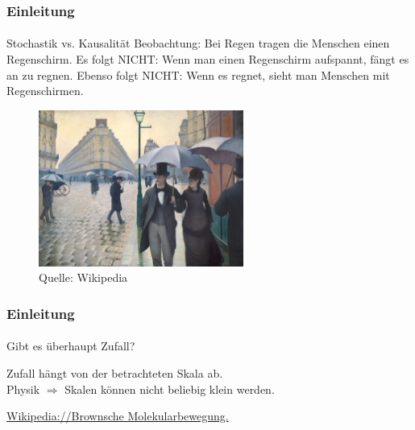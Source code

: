 \documentclass{beamer}
\begin{document}
\begin{frame}
    \frametitle{Einleitung}
\framesubtitle{}

    \begin{block}{Stochastik vs. Kausalität}
Beobachtung: Bei Regen tragen die Menschen einen Regenschirm.
Es folgt NICHT: Wenn man einen Regenschirm aufspannt, fängt es an zu regnen.
Ebenso folgt NICHT: Wenn es regnet, sieht man Menschen mit Regenschirmen. 
\end{block}


\begin{figure}[htp]
      \centering
    \includegraphics[width=0.6\textwidth]{img/Paris}

      \caption{Quelle: Wikipedia}
\end{figure}


\end{frame}




\begin{frame}
    \frametitle{Einleitung}
\framesubtitle{}
\begin{block}{}
Gibt es überhaupt Zufall? 
\end{block}
    \begin{block}{}
Zufall hängt von der betrachteten Skala ab. \\
Physik $\Rightarrow$ Skalen können nicht beliebig klein werden.
\end{block}
    \begin{block}{}
\href{https://de.wikipedia.org/wiki/Brownsche_Bewegung
}{Wikipedia://Brownsche Molekularbewegung.
}
\end{block}

\end{frame}
\end{document}
